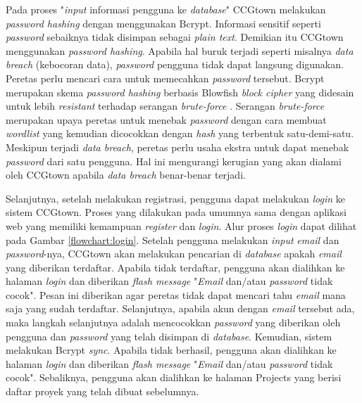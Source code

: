 Pada proses "\textit{input} informasi pengguna ke \textit{database}" CCGtown melakukan
\textit{password hashing} dengan menggunakan Bcrypt.
Informasi sensitif seperti \textit{password} sebaiknya tidak disimpan sebagai
\textit{plain text}. Demikian itu CCGtown menggunakan \textit{password hashing}.
Apabila hal buruk terjadi seperti misalnya \textit{data breach} (kebocoran data),
\textit{password} pengguna tidak dapat langsung digunakan.
Peretas perlu mencari cara untuk memecahkan \textit{password} tersebut.
Bcrypt merupakan skema \textit{password hashing} berbasis Blowfish \textit{block cipher}
yang didesain untuk lebih \textit{resistant} terhadap serangan \textit{brute-force}
\citep{bcrypt}.
Serangan \textit{brute-force} merupakan upaya peretas untuk menebak \textit{password}
dengan cara membuat \textit{wordlist} yang kemudian dicocokkan dengan \textit{hash}
yang terbentuk satu-demi-satu.
Meskipun terjadi \textit{data breach}, peretas perlu usaha ekstra untuk dapat menebak
\textit{password} dari satu pengguna.
Hal ini mengurangi kerugian yang akan dialami oleh CCGtown apabila \textit{data breach}
benar-benar terjadi.

Selanjutnya, setelah melakukan registrasi, pengguna dapat melakukan \textit{login} ke
sistem CCGtown.
Proses yang dilakukan pada umumnya sama dengan aplikasi web yang memiliki
kemampuan \textit{register} dan \textit{login}. Alur proses \textit{login} dapat dilihat
pada Gambar \ref{flowchart:login}.
Setelah pengguna melakukan \textit{input} \textit{email} dan \textit{password}-nya,
CCGtown akan melakukan pencarian di \textit{database} apakah \textit{email} yang
diberikan terdaftar. Apabila tidak terdaftar, pengguna akan dialihkan ke halaman
\textit{login} dan diberikan \textit{flash message} "\textit{Email} dan/atau
\textit{password} tidak cocok". Pesan ini diberikan agar peretas tidak dapat mencari
tahu \textit{email} mana saja yang sudah terdaftar. Selanjutnya, apabila akun
dengan \textit{email} tersebut ada, maka langkah selanjutnya adalah mencocokkan
\textit{password} yang diberikan oleh pengguna dan \textit{password} yang telah
disimpan di \textit{database}. Kemudian, sistem melakukan Bcrypt \textit{sync}.
Apabila tidak berhasil, pengguna akan dialihkan ke halaman \textit{login}
dan diberikan \textit{flash message} "\textit{Email} dan/atau \textit{password}
tidak cocok". Sebaliknya, pengguna akan dialihkan ke halaman Projects yang berisi
daftar proyek yang telah dibuat sebelumnya.


